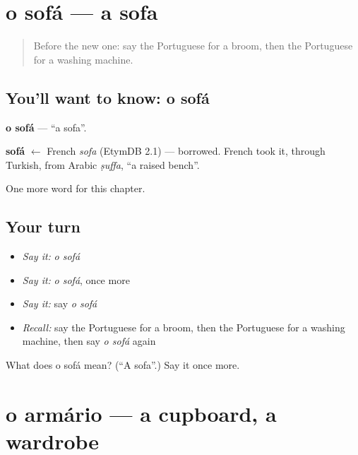 \section[o sofá]{o sofá — a sofa}

\label{lesson:PT-C96-sofa}



\begin{quote}
Before the new one: say the Portuguese for a broom, then the Portuguese for a washing machine.
\end{quote}

\subsection*{You'll want to know: o sofá}
\textbf{o sofá} — \textquotedblleft{}a sofa\textquotedblright{}.

\begin{cousinweb}
\textbf{sofá} $\leftarrow$ French \emph{sofa} (EtymDB 2.1) — borrowed. French took it, through Turkish, from Arabic \emph{ṣuffa}, \textquotedblleft{}a raised bench\textquotedblright{}.
\end{cousinweb}

\begin{grammarlens}[title={What you've built}]
One more word for this chapter.
\end{grammarlens}

\subsection*{Your turn}
\begin{itemize}
\raggedright
  \item \emph{Say it:} \emph{o sofá}
  \item \emph{Say it:} \emph{o sofá}, once more
  \item \emph{Say it:} say \emph{o sofá}
  \item \emph{Recall:} say the Portuguese for a broom, then the Portuguese for a washing machine, then say \emph{o sofá} again
\end{itemize}

\begin{tcolorbox}[breakable,colback=teal!4,colframe=teal!35!black,title={Before you move on}]
What does o sofá mean? (\textquotedblleft{}A sofa\textquotedblright{}.) Say it once more.
\end{tcolorbox}
\section[o armário]{o armário — a cupboard, a wardrobe}

